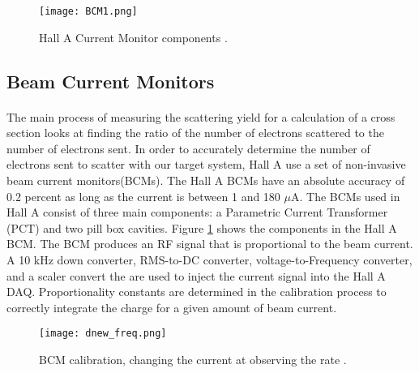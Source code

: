 		  	\begin{figure}[t]
  	 	 		\centering
  	 	 		\texttt{[image: BCM1.png]} 
  	 	 		\caption{Hall A Current Monitor components \cite{BCM1}.\label{BCMpng}}
		  	\end{figure}
	\subsection{Beam Current Monitors}
	\paragraph{} The main process of measuring the scattering yield for a calculation of a cross section looks at finding the ratio of the number of electrons scattered to the number of electrons sent. In order to accurately determine the number of electrons sent to scatter with our target system, Hall A use a set of non-invasive beam current monitors(BCMs). The Hall A BCMs have an absolute accuracy of 0.2 percent as long as the current is between 1 and 180 $\mu$A. The BCMs used in Hall A consist of three main components: a Parametric Current Transformer (PCT) and two pill box cavities. Figure \ref{BCMpng} shows the components in the Hall A BCM.  The BCM produces an RF signal that is proportional to the beam current. A 10 kHz down converter, RMS-to-DC converter, voltage-to-Frequency converter, and a scaler convert the are used to inject the current signal into the Hall A DAQ. Proportionality constants are determined in the calibration process to correctly integrate the charge for a given amount of beam current\cite{BCM1}.
	\begin{figure}[t]
		\centering
		\texttt{[image: dnew\_freq.png]}
		\caption{BCM calibration, changing the current at observing the rate \cite{MikeTh}.
		\label{dnewfreq}}
	\end{figure}
